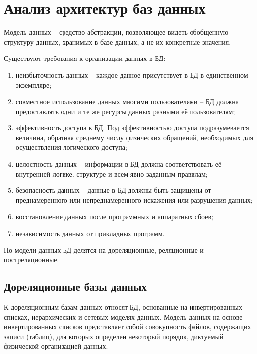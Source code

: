 \section{Анализ архитектур баз данных}

Модель данных -- средство абстракции, позволяющее видеть обобщенную структуру данных, хранимых в базе данных, а не их конкретные значения\cite{dm}.

Существуют требования к организации данных в БД\cite{bd:2023}:
\begin{enumerate}
	\item неизбыточность данных -- каждое данное присутствует в БД в единственном экземпляре;
	\item совместное использование данных многими пользователями -- БД должна предоставлять одни и те же ресурсы данных разными её пользователям;
	\item эффективность доступа к БД. Под эффективностью доступа подразумевается величина, обратная среднему числу физических обращений, необходимых для осуществления логического доступа;
	\item целостность данных -- информации в БД должна соответствовать её внутренней логике, структуре и всем явно заданным правилам;
	\item безопасность данных -- данные в БД должны быть защищены от преднамеренного или непреднамеренного искажения или разрушения данных;
	\item восстановление данных после программных и аппаратных сбоев;
	\item независимость данных от прикладных программ.
\end{enumerate}

По модели данных БД делятся на дореляционные, реляционные и постреляционные\cite{bd:2023}.

\subsection{Дореляционные базы данных}

К дореляционным базам данных относят БД, основанные на инвертированных списках, иерархических и сетевых моделях данных.
Модель данных на основе инвертированных списков представляет собой совокупность файлов, содержащих записи (таблиц), для которых определен некоторый порядок, диктуемый физической организацией данных\cite{bd:2023}.


